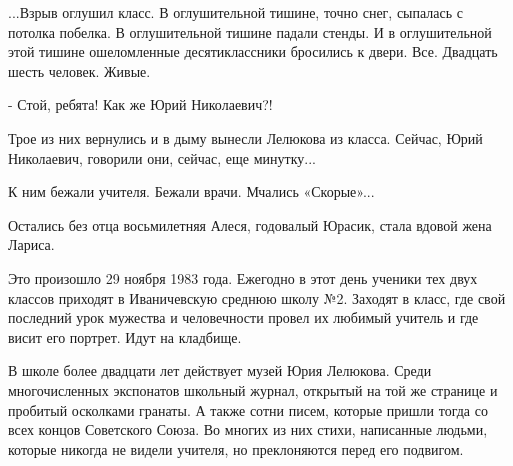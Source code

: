 ...Взрыв оглушил класс. В оглушительной тишине, точно снег, сыпалась с потолка
побелка. В оглушительной тишине падали стенды. И в оглушительной этой тишине
ошеломленные десятиклассники бросились к двери.  Все. Двадцать шесть человек.
Живые.

- Стой, ребята! Как же Юрий Николаевич?!

Трое из них вернулись и в дыму вынесли Лелюкова из класса. Сейчас, Юрий
Николаевич, говорили они, сейчас, еще минутку...

К ним бежали учителя. Бежали врачи. Мчались «Скорые»...

Остались без отца восьмилетняя Алеся, годовалый Юрасик, стала вдовой жена Лариса.

Это произошло 29 ноября 1983 года. Ежегодно в этот день ученики тех двух
классов приходят в Иваничевскую среднюю школу №2. Заходят в класс, где свой
последний урок мужества и человечности провел их любимый учитель и где висит
его портрет. Идут на кладбище.

В школе более двадцати лет действует музей Юрия Лелюкова. Среди многочисленных
экспонатов школьный журнал, открытый на той же странице и пробитый осколками
гранаты. А также сотни писем, которые пришли тогда со всех концов Советского
Союза. Во многих из них стихи, написанные людьми, которые никогда не видели
учителя, но преклоняются перед его подвигом.

